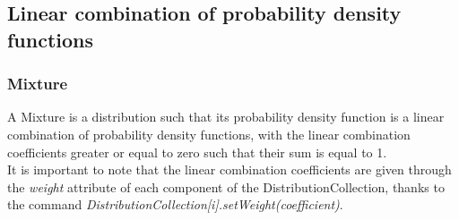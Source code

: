 
\newpage \subsection{Linear combination of probability density functions}

\subsubsection{Mixture}

A Mixture is a distribution such that its probability density function is a linear combination of probability density functions, with the linear combination coefficients greater or equal to zero such that their sum is equal to 1. \\
It is important to note that the linear combination coefficients are given through the {\itshape weight} attribute of each component of the DistributionCollection, thanks to the command {\itshape DistributionCollection[i].setWeight(coefficient)}.

